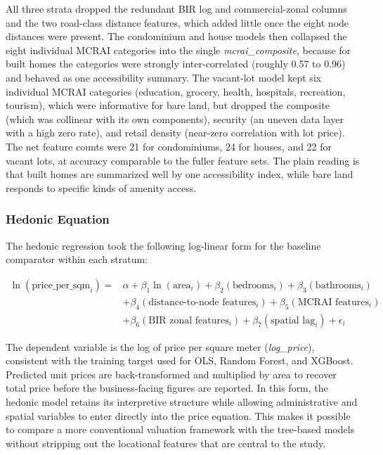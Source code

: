 All three strata dropped the redundant BIR log and commercial-zonal columns and the two road-class distance features, which added little once the eight node distances were present. The condominium and house models then collapsed the eight individual MCRAI categories into the single \emph{mcrai\_composite}, because for built homes the categories were strongly inter-correlated (roughly 0.57 to 0.96) and behaved as one accessibility summary. The vacant-lot model kept six individual MCRAI categories (education, grocery, health, hospitals, recreation, tourism), which were informative for bare land, but dropped the composite (which was collinear with its own components), security (an uneven data layer with a high zero rate), and retail density (near-zero correlation with lot price). The net feature counts were 21 for condominiums, 24 for houses, and 22 for vacant lots, at accuracy comparable to the fuller feature sets. The plain reading is that built homes are summarized well by one accessibility index, while bare land responds to specific kinds of amenity access.

\subsubsection{Hedonic Equation}\label{hedonic-equation}

The hedonic regression took the following log-linear form for the baseline comparator within each stratum:

\[
\begin{aligned}
\ln(\text{price\_per\_sqm}_i) ={}& \alpha + \beta_1 \ln(\text{area}_i) + \beta_2(\text{bedrooms}_i) + \beta_3(\text{bathrooms}_i) \\
& + \beta_4(\text{distance-to-node features}_i) + \beta_5(\text{MCRAI features}_i) \\
& + \beta_6(\text{BIR zonal features}_i) + \beta_7(\text{spatial lag}_i) + \epsilon_i
\end{aligned}
\]

The dependent variable is the log of price per square meter (\emph{log\_price}), consistent with the training target used for OLS, Random Forest, and XGBoost. Predicted unit prices are back-transformed and multiplied by area to recover total price before the business-facing figures are reported. In this form, the hedonic model retains its interpretive structure while allowing administrative and spatial variables to enter directly into the price equation. This makes it possible to compare a more conventional valuation framework with the tree-based models without stripping out the locational features that are central to the study.

